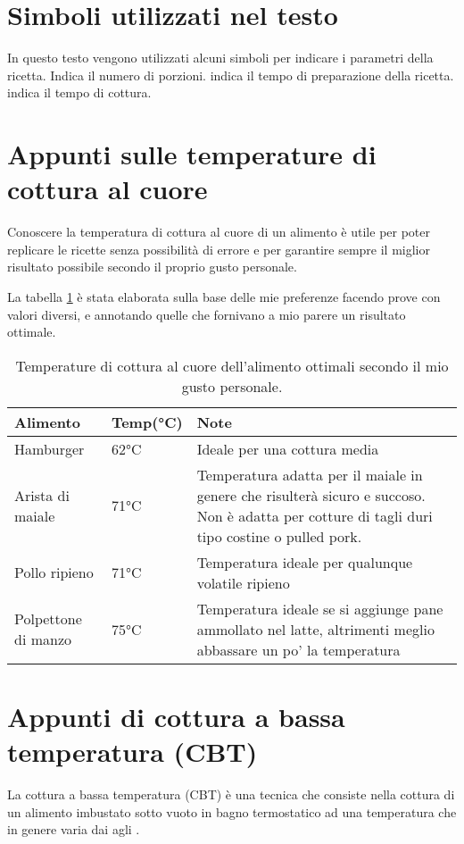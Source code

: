 \section{Simboli utilizzati nel testo}
In questo testo vengono utilizzati alcuni simboli per indicare i parametri della ricetta. \Fork\Dish\Knife \> Indica il numero di porzioni. \Gloves \> indica il tempo di preparazione della ricetta. \Gasstove \> indica il tempo di cottura.

\section{Appunti sulle temperature di cottura al cuore}
Conoscere la temperatura di cottura al cuore di un alimento è utile per poter replicare le ricette senza possibilità di errore e per garantire sempre il miglior risultato possibile secondo il proprio gusto personale.

La tabella \ref{temperature-al-cuore} è stata elaborata sulla base delle mie preferenze facendo prove con valori diversi, e annotando quelle che fornivano a mio parere un risultato ottimale.



\begin{table}
\begin{tabular}{llp{}}
\toprule
Alimento				&	Temp(°C)		&		Note		\\
\midrule
Hamburger			& 	62°C 		& Ideale per una cottura media\\
Arista di maiale	& 	71°C 		& Temperatura adatta per il maiale in genere che risulterà sicuro e succoso. Non è adatta per cotture di tagli duri tipo costine o pulled pork. \\
Pollo ripieno 		& 	71°C 		& Temperatura ideale per qualunque volatile ripieno\\
Polpettone di manzo	&	75°C 		& Temperatura ideale se si aggiunge pane ammollato nel latte, altrimenti meglio abbassare un po' la temperatura\\
\bottomrule
\end{tabular}
\caption{Temperature di cottura al cuore dell'alimento ottimali secondo il mio gusto personale.}\label{temperature-al-cuore}

\end{table}

\section{Appunti di cottura a bassa temperatura (CBT)}
La cottura a bassa temperatura (CBT) è una tecnica che consiste nella cottura di un alimento imbustato sotto vuoto in bagno termostatico ad una temperatura che in genere varia dai  agli .

